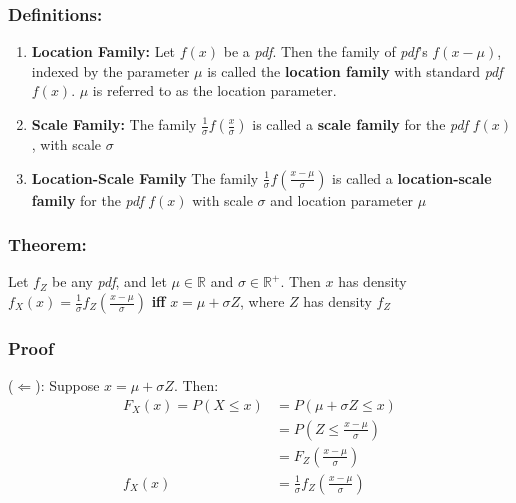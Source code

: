 \documentclass{article}
\begin{document}
\subsubsection*{Definitions:}
    \begin{enumerate}
        \item \textbf{Location Family:} Let $f(x)$ be a \textit{pdf}. Then the family of \textit{pdf}'s $f(x-\mu)$, indexed by the parameter $\mu$ is called the \textbf{location family} with standard \textit{pdf} $f(x)$. $\mu$ is referred to as the location parameter.
        
        \item \textbf{Scale Family:} The family $\frac{1}{\sigma} f(\frac{x}{\sigma})$ is called a \textbf{scale family} for the \textit{pdf} $f(x)$, with scale $\sigma$
        
        \item \textbf{Location-Scale Family} The family $\frac{1}{\sigma} f(\frac{x-\mu}{\sigma})$ is called a \textbf{location-scale family} for the \textit{pdf} $f(x)$ with scale $\sigma$ and location parameter $\mu$ 
    \end{enumerate}

\subsubsection*{Theorem:}
    Let $f_Z$ be any \textit{pdf}, and let $\mu \in \mathbb{R}$ and $\sigma \in \mathbb{R}^+$. Then $x$ has density $f_X(x) = \frac{1}{\sigma}f_Z(\frac{x-\mu}{\sigma})$ \textbf{iff} $x = \mu + \sigma Z$, where $Z$ has density $f_Z$

\subsubsection*{Proof}
    ($\Leftarrow$): Suppose $x=\mu + \sigma Z$. Then:
    \begin{equation*}
        \begin{split}
            F_X(x) = P(X \leq x) &= P(\mu + \sigma Z \leq x)\\
                &= P\left(Z \leq \frac{x-\mu}{\sigma}\right) \\
                &= F_Z\left(\frac{x-\mu}{\sigma}\right)\\
                f_X(x) &= \frac{1}{\sigma} f_Z\left(\frac{x-\mu}{\sigma}\right)
        \end{split}
    \end{equation*}
    
\end{document}
